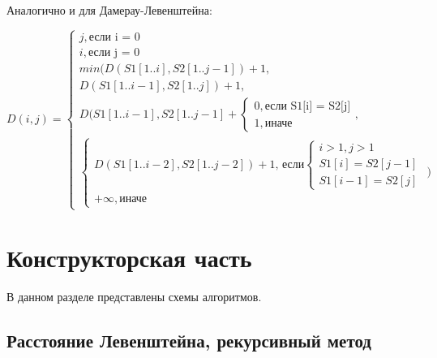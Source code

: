 \documentclass[12pt,a4paper]{report}
\begin{document}
Аналогично и для Дамерау-Левенштейна:

\begin{displaymath}
    D(i, j) = \left\{
        \begin{array}{ll}
            j, \textrm{если i = 0} \\
            i, \textrm{если j = 0} \\
            min(D(S1[1..i], S2[1..j-1]) + 1,\\
                D(S1[1..i-1], S2[1..j]) + 1,\\
                D(S1[1..i-1], S2[1..j-1] + \left \{ 
                \begin{array}{ll}
                    0, \textrm{если S1[i] = S2[j]} \\ 
                    1, \textrm{иначе}
                \end{array} \right.
            , \\
                \left \{ \begin{array}{ll}
                    D(S1[1..i-2], S2[1..j-2]) + 1 \textrm{, если} \left \{ 
                    \begin{array}{ll}
                        i > 1, j > 1 \\
                        S1[i] = S2[j-1] \\
                        S1[i-1] = S2[j]
                    \end{array} \right. \\
                    +\infty, \textrm{иначе}
                \end{array} \right. 
            )
    \end{array} \right.
\end{displaymath}

\newpage
\chapter{Конструкторская часть}

В данном разделе представлены схемы алгоритмов.

\section{Расстояние Левенштейна, рекурсивный метод}
\end{document}
